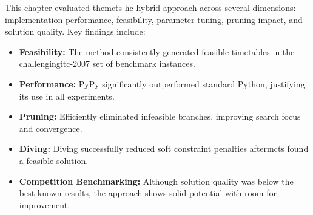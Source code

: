 This chapter evaluated the\ac{mcts}-\ac{hc} hybrid approach across several dimensions: implementation performance, feasibility, parameter tuning, pruning impact, and solution quality. Key findings include:

\begin{itemize}
\item \textbf{Feasibility:} The method consistently generated feasible timetables in the challenging\ac{itc-2007} set of benchmark instances.

\item \textbf{Performance:} PyPy significantly outperformed standard Python, justifying its use in all experiments.

\item \textbf{Pruning:} Efficiently eliminated infeasible branches, improving search focus and convergence.

\item \textbf{Diving:} Diving successfully reduced soft constraint penalties after\ac{mcts} found a feasible solution.

\item \textbf{Competition Benchmarking:} Although solution quality was below the best-known results, the approach shows solid potential with room for improvement.
\end{itemize}